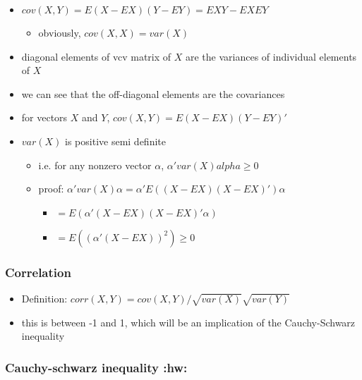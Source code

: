 \documentclass[11pt]{article}
\begin{document}
\begin{itemize}
\item $cov(X,Y) = E(X - E X) (Y - EY) = E XY - EX EY$
\begin{itemize}
\item obviously, $cov(X,X) = var(X)$
\end{itemize}
\item diagonal elements of vcv matrix of $X$ are the variances of individual elements of $X$
\item we can see that the off-diagonal elements are the covariances
\item for vectors $X$ and $Y$, $cov(X,Y) = E(X - EX)(Y - EY)'$
\item $var(X)$ is positive semi definite
\begin{itemize}
\item i.e. for any nonzero vector $\alpha$, $\alpha' var(X)
            alpha \geq 0$
\item proof: $\alpha'var(X) \alpha = \alpha' E((X - EX)(X -
            EX)') \alpha$
\begin{itemize}
\item $= E(\alpha'(X - EX)(X - EX)' \alpha)$
\item $= E((\alpha'(X-EX))^2) \geq 0$
\end{itemize}
\end{itemize}
\end{itemize}
\subsubsection{Correlation}
\label{sec-3-2-3}

\begin{itemize}
\item Definition: $corr(X, Y) = cov(X,Y) / \sqrt{var(X)} \sqrt{var(Y)}$
\item this is between -1 and 1, which will be an implication of the Cauchy-Schwarz inequality
\end{itemize}
\subsubsection{Cauchy-schwarz inequality \textbf{:hw:}}
\label{sec-3-2-4}
\end{document}
